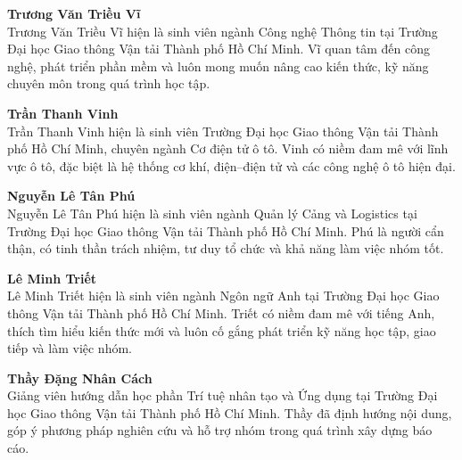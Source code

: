 \documentclass{iaesarticle}
\begin{document}
\vspace{.7em}
\begin{biography}
\textbf{Trương Văn Triều Vĩ}\\
Trương Văn Triều Vĩ hiện là sinh viên ngành Công nghệ Thông tin tại Trường Đại học Giao thông Vận tải Thành phố Hồ Chí Minh. Vĩ quan tâm đến công nghệ, phát triển phần mềm và luôn mong muốn nâng cao kiến thức, kỹ năng chuyên môn trong quá trình học tập.
\end{biography}

\vspace{.7em}
\begin{biography}
\textbf{Trần Thanh Vinh}\\
Trần Thanh Vinh hiện là sinh viên Trường Đại học Giao thông Vận tải Thành phố Hồ Chí Minh, chuyên ngành Cơ điện tử ô tô. Vinh có niềm đam mê với lĩnh vực ô tô, đặc biệt là hệ thống cơ khí, điện--điện tử và các công nghệ ô tô hiện đại.
\end{biography}

\vspace{.7em}
\begin{biography}
\textbf{Nguyễn Lê Tân Phú}\\
Nguyễn Lê Tân Phú hiện là sinh viên ngành Quản lý Cảng và Logistics tại Trường Đại học Giao thông Vận tải Thành phố Hồ Chí Minh. Phú là người cẩn thận, có tinh thần trách nhiệm, tư duy tổ chức và khả năng làm việc nhóm tốt.
\end{biography}

\vspace{.7em}
\begin{biography}
\textbf{Lê Minh Triết}\\
Lê Minh Triết hiện là sinh viên ngành Ngôn ngữ Anh tại Trường Đại học Giao thông Vận tải Thành phố Hồ Chí Minh. Triết có niềm đam mê với tiếng Anh, thích tìm hiểu kiến thức mới và luôn cố gắng phát triển kỹ năng học tập, giao tiếp và làm việc nhóm.
\end{biography}

\vspace{.7em}
\begin{biography}
\textbf{Thầy Đặng Nhân Cách}\\
Giảng viên hướng dẫn học phần Trí tuệ nhân tạo và Ứng dụng tại Trường Đại học Giao thông Vận tải Thành phố Hồ Chí Minh. Thầy đã định hướng nội dung, góp ý phương pháp nghiên cứu và hỗ trợ nhóm trong quá trình xây dựng báo cáo.
\end{biography}
\end{document}
